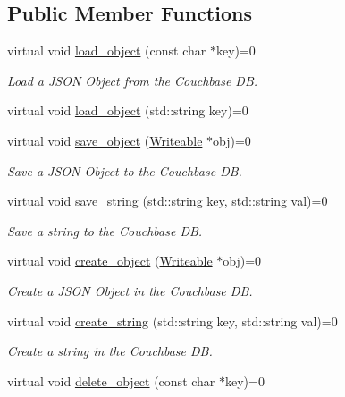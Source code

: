 \subsection*{Public Member Functions}
\begin{DoxyCompactItemize}
\item 
virtual void \hyperlink{classCouchbaseInterface_a62a765de48bfc92d748df829ca960ff2}{load\-\_\-object} (const char $\ast$key)=0
\begin{DoxyCompactList}\small\item\em Load a J\-S\-O\-N Object from the Couchbase D\-B. \end{DoxyCompactList}\item 
virtual void \hyperlink{classCouchbaseInterface_a1aee19796f864ff531cbb55f42764bf6}{load\-\_\-object} (std\-::string key)=0
\item 
virtual void \hyperlink{classCouchbaseInterface_ab4ea907f469d14323e451ffdccb213c2}{save\-\_\-object} (\hyperlink{classWriteable}{Writeable} $\ast$obj)=0
\begin{DoxyCompactList}\small\item\em Save a J\-S\-O\-N Object to the Couchbase D\-B. \end{DoxyCompactList}\item 
virtual void \hyperlink{classCouchbaseInterface_a2282fc90812d3397a0c4d31fb31b7dab}{save\-\_\-string} (std\-::string key, std\-::string val)=0
\begin{DoxyCompactList}\small\item\em Save a string to the Couchbase D\-B. \end{DoxyCompactList}\item 
virtual void \hyperlink{classCouchbaseInterface_a7ac9545e6f7a45d24e8e41ccae1f6112}{create\-\_\-object} (\hyperlink{classWriteable}{Writeable} $\ast$obj)=0
\begin{DoxyCompactList}\small\item\em Create a J\-S\-O\-N Object in the Couchbase D\-B. \end{DoxyCompactList}\item 
virtual void \hyperlink{classCouchbaseInterface_a8c706d3865fad2f5908167403b5d3101}{create\-\_\-string} (std\-::string key, std\-::string val)=0
\begin{DoxyCompactList}\small\item\em Create a string in the Couchbase D\-B. \end{DoxyCompactList}\item 
virtual void \hyperlink{classCouchbaseInterface_a99ec66952f649bb84c80b20487e82839}{delete\-\_\-object} (const char $\ast$key)=0

\end{DoxyCompactItemize}
